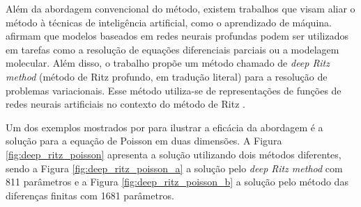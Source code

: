 \documentclass[
	12pt,				%
	openright,			%
    twoside,			%
	a4paper,			%
	chapter=TITLE,		%
	english,			%
	french,				%
	spanish,			%
	brazil				%
	]{abntex2}
\numberwithin{lema}{chapter}
\numberwithin{teorema}{chapter}
\numberwithin{definicao}{chapter}
\numberwithin{exemplo}{chapter}
\numberwithin{figure}{chapter}
\begin{document}
Além da abordagem convencional do método, existem trabalhos que visam aliar o método à técnicas de inteligência artificial, como o aprendizado de máquina.  afirmam que modelos baseados em redes neurais profundas podem ser utilizados em tarefas como a resolução de equações diferenciais parciais ou a modelagem molecular. Além disso, o trabalho propõe um método chamado de \textit{deep Ritz method} (método de Ritz profundo, em tradução literal) para a resolução de problemas variacionais. Esse método utiliza-se de representações de funções de redes neurais artificiais no contexto do método de Ritz \cite{deep_ritz}. 

Um dos exemplos mostrados por  para ilustrar a eficácia da abordagem é a solução para a equação de Poisson em duas dimensões. A Figura \ref{fig:deep_ritz_poisson} apresenta a solução utilizando dois métodos diferentes, sendo a Figura \ref{fig:deep_ritz_poisson_a} a solução pelo \textit{deep Ritz method} com 811 parâmetros e a Figura \ref{fig:deep_ritz_poisson_b} a solução pelo método das diferenças finitas com 1681 parâmetros.
\end{document}
